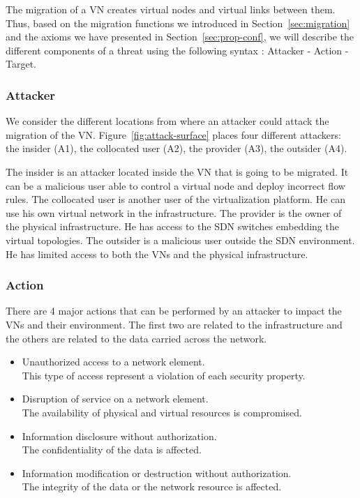 

\label{sec:attacker-model}
The migration of a VN creates virtual nodes and virtual links between them.
Thus, based on  the migration functions we introduced in Section~\ref{sec:migration} and the axioms we have presented in Section~\ref{sec:prop-conf}, we will describe the different components of a threat using the following syntax
: Attacker - Action - Target.

\subsubsection{Attacker}
We consider the different locations from where an attacker could attack the migration of the VN. 
Figure~\ref{fig:attack-surface} places four different attackers: the insider (A1), the collocated user (A2), the provider (A3), the outsider (A4).

The insider is an attacker located inside the VN that is going to be migrated.
It can be a malicious user able to control a virtual node and deploy incorrect flow rules.
The collocated user is another user of the virtualization platform.
He can use his own virtual network in the infrastructure.
The provider is the owner of the physical infrastructure.
He has access to the SDN switches embedding the virtual topologies.
The outsider is a malicious user outside the SDN environment.
He has limited access to both the VNs and the physical infrastructure.

\subsubsection{Action}
There are 4 major actions that can be performed by an attacker to impact the VNs and their environment.
The first two are related to the infrastructure and the others are related to the data carried across the network.
\begin{itemize}
\item Unauthorized access to a network element.
\\ This type of access represent a violation of each security property.
\item Disruption of service on a network element.
\\ The availability of physical and virtual resources is compromised.
\item Information disclosure without authorization.
\\ The confidentiality of the data is affected.
\item Information modification or destruction without authorization.
\\ The integrity of the data or the network resource is affected.
\end{itemize}

